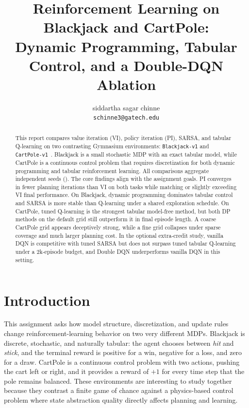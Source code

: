\documentclass[letterpaper, 10 pt, conference]{ieeeconf}
\title{\LARGE \bf
Reinforcement Learning on Blackjack and CartPole:\\
Dynamic Programming, Tabular Control, and a Double-DQN Ablation
}
\author{siddartha sagar chinne\\
{\tt\small schinne3@gatech.edu}
}
\begin{document}
\maketitle
\thispagestyle{empty}
\pagestyle{empty}

\begin{abstract}
This report compares value iteration (VI), policy iteration (PI), SARSA, and tabular Q-learning on two contrasting Gymnasium environments: \texttt{Blackjack-v1} and \texttt{CartPole-v1}~\cite{towers2024gymnasium}. Blackjack is a small stochastic MDP with an exact tabular model, while CartPole is a continuous control problem that requires discretization for both dynamic programming and tabular reinforcement learning. All comparisons aggregate \NumSeeds independent seeds (\SeedList). The core findings align with the assignment goals. PI converges in fewer planning iterations than VI on both tasks while matching or slightly exceeding VI final performance. On Blackjack, dynamic programming dominates tabular control and SARSA is more stable than Q-learning under a shared exploration schedule. On CartPole, tuned Q-learning is the strongest tabular model-free method, but both DP methods on the default grid still outperform it in final episode length. A coarse CartPole grid appears deceptively strong, while a fine grid collapses under sparse coverage and much larger planning cost. In the optional extra-credit study, vanilla DQN is competitive with tuned SARSA but does not surpass tuned tabular Q-learning under a 2k-episode budget, and Double DQN underperforms vanilla DQN in this setting.
\end{abstract}

\section{Introduction}

This assignment asks how model structure, discretization, and update rules change reinforcement-learning behavior on two very different MDPs. Blackjack is discrete, stochastic, and naturally tabular: the agent chooses between \emph{hit} and \emph{stick}, and the terminal reward is positive for a win, negative for a loss, and zero for a draw. CartPole is a continuous control problem with two actions, pushing the cart left or right, and it provides a reward of $+1$ for every time step that the pole remains balanced. These environments are interesting to study together because they contrast a finite game of chance against a physics-based control problem where state abstraction quality directly affects planning and learning.
\end{document}
